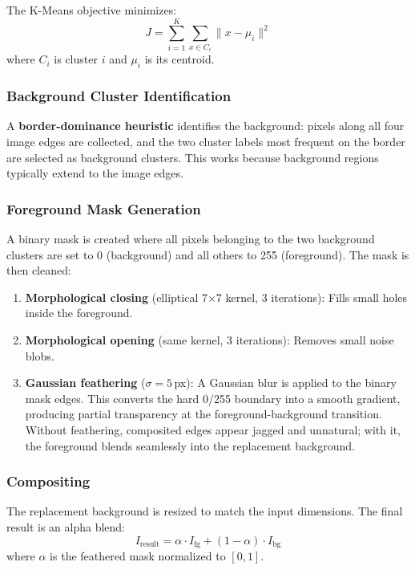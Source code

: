 \documentclass[conference,twocolumn]{IEEEtran}
\begin{document}
The K-Means objective minimizes:
\begin{equation}
    J = \sum_{i=1}^{K} \sum_{x \in C_i} \| x - \mu_i \|^2
\end{equation}
where $C_i$ is cluster $i$ and $\mu_i$ is its centroid.

\subsubsection{Background Cluster Identification}

A \textbf{border-dominance heuristic} identifies the background: pixels along all four image edges are collected, and the two cluster labels most frequent on the border are selected as background clusters. This works because background regions typically extend to the image edges.

\subsubsection{Foreground Mask Generation}

A binary mask is created where all pixels belonging to the two background clusters are set to 0 (background) and all others to 255 (foreground). The mask is then cleaned:

\begin{enumerate}
    \item \textbf{Morphological closing} (elliptical 7$\times$7 kernel, 3 iterations): Fills small holes inside the foreground.
    \item \textbf{Morphological opening} (same kernel, 3 iterations): Removes small noise blobs.
    \item \textbf{Gaussian feathering} ($\sigma = 5$\,px): A Gaussian blur is applied to the binary mask edges. This converts the hard 0/255 boundary into a smooth gradient, producing partial transparency at the foreground-background transition. Without feathering, composited edges appear jagged and unnatural; with it, the foreground blends seamlessly into the replacement background.
\end{enumerate}

\subsubsection{Compositing}

The replacement background is resized to match the input dimensions. The final result is an alpha blend:
\begin{equation}
    I_{\text{result}} = \alpha \cdot I_{\text{fg}} + (1 - \alpha) \cdot I_{\text{bg}}
\end{equation}
where $\alpha$ is the feathered mask normalized to $[0, 1]$.
\end{document}
